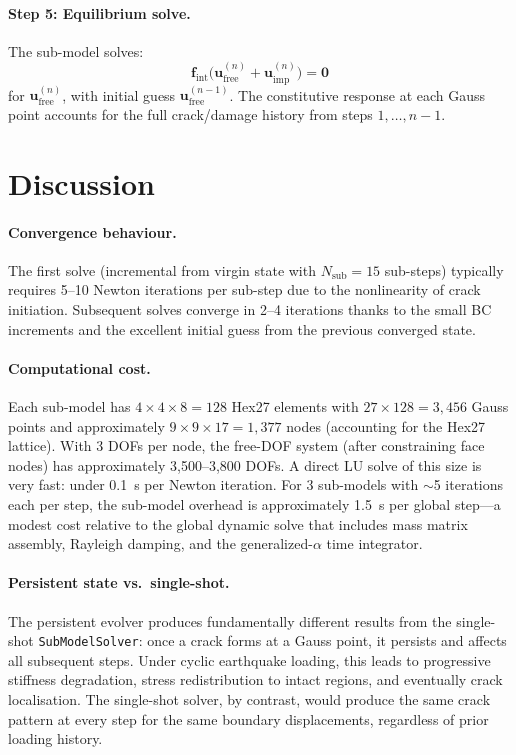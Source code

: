 \paragraph{Step 5: Equilibrium solve.}
The sub-model solves:
\begin{equation}
  \mathbf{f}_{\mathrm{int}}
    \bigl(\mathbf{u}_{\mathrm{free}}^{(n)}
          + \mathbf{u}_{\mathrm{imp}}^{(n)}\bigr)
  = \mathbf{0}
  \label{eq:nlevo-submodel-eq}
\end{equation}
for $\mathbf{u}_{\mathrm{free}}^{(n)}$, with initial guess
$\mathbf{u}_{\mathrm{free}}^{(n-1)}$.  The constitutive response at
each Gauss point accounts for the full crack/damage history from
steps $1, \ldots, n{-}1$.


\section{Discussion}
\label{sec:nlevo-discussion}

\paragraph{Convergence behaviour.}
The first solve (incremental from virgin state with $N_{\mathrm{sub}}
= 15$ sub-steps) typically requires 5--10 Newton iterations per
sub-step due to the nonlinearity of crack initiation.  Subsequent
solves converge in 2--4 iterations thanks to the small BC increments
and the excellent initial guess from the previous converged state.

\paragraph{Computational cost.}
Each sub-model has $4 \times 4 \times 8 = 128$ Hex27 elements with
$27 \times 128 = 3{,}456$ Gauss points and
approximately $9 \times 9 \times 17 = 1{,}377$ nodes (accounting for
the Hex27 lattice).  With 3 DOFs per node, the free-DOF system
(after constraining face nodes) has approximately 3{,}500--3{,}800 DOFs.
A direct LU solve of this size is very fast: under 0.1~s per Newton
iteration.  For 3 sub-models with $\sim$5 iterations each per step,
the sub-model overhead is approximately 1.5~s per global step---a
modest cost relative to the global dynamic solve that includes
mass matrix assembly, Rayleigh damping, and the generalized-$\alpha$
time integrator.

\paragraph{Persistent state vs.\ single-shot.}
The persistent evolver produces fundamentally different results from
the single-shot \texttt{SubModelSolver}: once a crack forms at a Gauss
point, it persists and affects all subsequent steps.  Under cyclic
earthquake loading, this leads to progressive stiffness degradation,
stress redistribution to intact regions, and eventually crack
localisation.  The single-shot solver, by contrast, would produce the
same crack pattern at every step for the same boundary displacements,
regardless of prior loading history.

